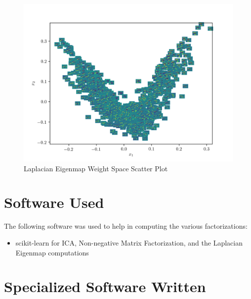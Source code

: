 \documentclass{article}[12pt]
\begin{document}
   \begin{figure}[ht]
   \centerline{
   \includegraphics[scale=1.4]{p3/selm_weightspace_images_6.png}}
   \caption{Laplacian Eigenmap Weight Space Scatter Plot}
   \label{fig:leig_scatter}
   \end{figure}
   
   \section{Software Used}
   The following software was used to help in computing the various factorizations:
   
   \begin{itemize}
   \item scikit-learn for ICA, Non-negative Matrix Factorization, and the Laplacian Eigenmap computations
   \end{itemize}
   
   \newpage
   \section{Specialized Software Written}
   
\end{document}
